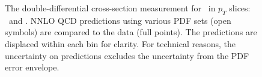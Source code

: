 \begin{figure}[phtb]
  \begin{center}
 \caption{ The double-differential cross-section measurement for \Wminusmunu\ in $p_T$ slices: \ptThree\ and \ptFour. NNLO QCD predictions using various PDF sets (open symbols) are compared to the data (full points). The predictions are displaced within each bin for clarity. For technical reasons, the uncertainty on predictions excludes the uncertainty from the PDF error envelope. }
 \label{fig:Comb:NNLO:W2dNEG_2}
 \end{center}
\end{figure}

